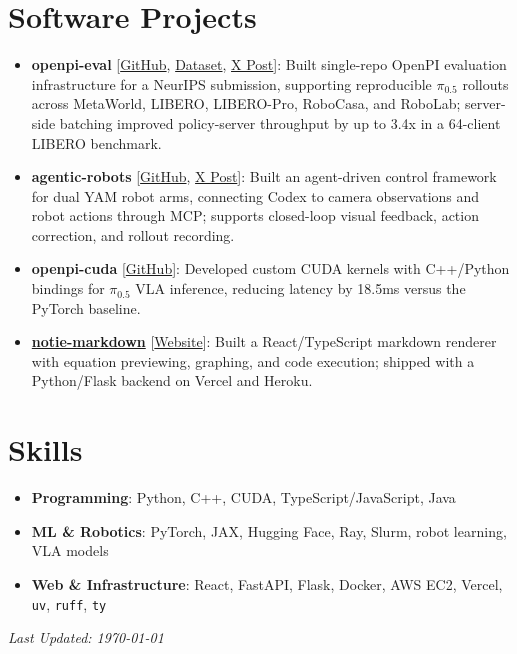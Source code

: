 \documentclass[letterpaper,11pt]{article}
\newcommand{\linkhref}[2]{\textcolor{linkblue}{\href{#1}{#2}}}
\begin{document}
\section{Software Projects}
\begin{itemize}[label={}, leftmargin=0pt]
    \item \textbf{openpi-eval} [\linkhref{https://github.com/branyang02/openpi-eval}{GitHub}, \linkhref{https://huggingface.co/datasets/brandonyang/metaworld_ml45}{Dataset}, \linkhref{https://x.com/brandonyyang02/status/2062678343452135771}{X Post}]: Built single-repo OpenPI evaluation infrastructure for a NeurIPS submission, supporting reproducible $\pi_{0.5}$ rollouts across MetaWorld, LIBERO, LIBERO-Pro, RoboCasa, and RoboLab; server-side batching improved policy-server throughput by up to 3.4x in a 64-client LIBERO benchmark.
    \item \textbf{agentic-robots} [\linkhref{https://github.com/branyang02/agentic-robots}{GitHub}, \linkhref{https://x.com/amish_sethi04/status/2102012466758885392}{X Post}]: Built an agent-driven control framework for dual YAM robot arms, connecting Codex to camera observations and robot actions through MCP; supports closed-loop visual feedback, action correction, and rollout recording.
    \item \textbf{openpi-cuda} [\linkhref{https://github.com/branyang02/openpi-cuda}{GitHub}]: Developed custom CUDA kernels with C++/Python bindings for $\pi_{0.5}$ VLA inference, reducing latency by 18.5ms versus the PyTorch baseline.
    \item \textbf{\href{https://notie-markdown.vercel.app/}{notie-markdown}} [\linkhref{https://notie-markdown.vercel.app/}{Website}]: Built a React/TypeScript markdown renderer with equation previewing, graphing, and code execution; shipped with a Python/Flask backend on Vercel and Heroku.
\end{itemize}

\section{Skills}
\begin{itemize}[label={}, leftmargin=0pt]
    \item \textbf{Programming}: Python, C++, CUDA, TypeScript/JavaScript, Java
    \item \textbf{ML \& Robotics}: PyTorch, JAX, Hugging Face, Ray, Slurm, robot learning, VLA models
    \item \textbf{Web \& Infrastructure}: React, FastAPI, Flask, Docker, AWS EC2, Vercel, \verb|uv|, \verb|ruff|, \verb|ty|
\end{itemize}

\vfill
\noindent\textit{\small Last Updated: \today}
\end{document}
